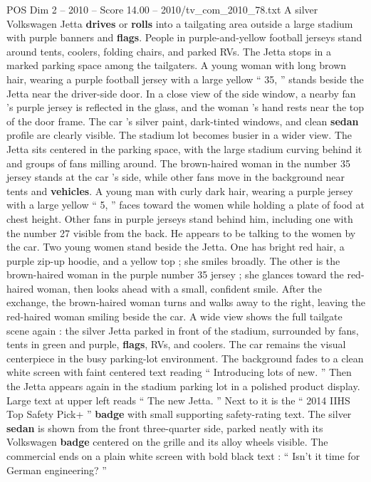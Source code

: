 \begin{textsample}{POS Dim 2 – 2010 – Score 14.00 – 2010/tv\_com\_2010\_78.txt}
A silver Volkswagen Jetta \textbf{drives} or \textbf{rolls} into a tailgating area outside a large stadium with purple banners and \textbf{flags}.
People in purple-and-yellow football jerseys stand around tents, coolers, folding chairs, and parked RVs.
The Jetta stops in a marked parking space among the tailgaters.
A young woman with long brown hair, wearing a purple football jersey with a large yellow “ 35, ” stands beside the Jetta near the driver-side door.
In a close view of the side window, a nearby fan ’s purple jersey is reflected in the glass, and the woman ’s hand rests near the top of the door frame.
The car ’s silver paint, dark-tinted windows, and clean \textbf{sedan} profile are clearly visible.
The stadium lot becomes busier in a wider view.
The Jetta sits centered in the parking space, with the large stadium curving behind it and groups of fans milling around.
The brown-haired woman in the number 35 jersey stands at the car ’s side, while other fans move in the background near tents and \textbf{vehicles}.
A young man with curly dark hair, wearing a purple jersey with a large yellow “ 5, ” faces toward the women while holding a plate of food at chest height.
Other fans in purple jerseys stand behind him, including one with the number 27 visible from the back.
He appears to be talking to the women by the car.
Two young women stand beside the Jetta.
One has bright red hair, a purple zip-up hoodie, and a yellow top ; she smiles broadly.
The other is the brown-haired woman in the purple number 35 jersey ; she glances toward the red-haired woman, then looks ahead with a small, confident smile.
After the exchange, the brown-haired woman turns and walks away to the right, leaving the red-haired woman smiling beside the car.
A wide view shows the full tailgate scene again : the silver Jetta parked in front of the stadium, surrounded by fans, tents in green and purple, \textbf{flags}, RVs, and coolers.
The car remains the visual centerpiece in the busy parking-lot environment.
The background fades to a clean white screen with faint centered text reading “ Introducing lots of new. ” Then the Jetta appears again in the stadium parking lot in a polished product display.
Large text at upper left reads “ The new Jetta. ” Next to it is the “ 2014 IIHS Top Safety Pick+ ” \textbf{badge} with small supporting safety-rating text.
The silver \textbf{sedan} is shown from the front three-quarter side, parked neatly with its Volkswagen \textbf{badge} centered on the grille and its alloy wheels visible.
The commercial ends on a plain white screen with bold black text : “ Isn't it time for German engineering? ”

\end{textsample}
